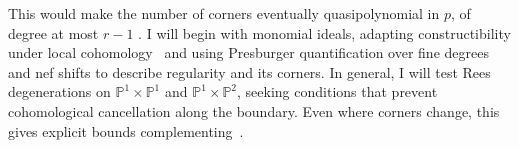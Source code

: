 \documentclass[11pt,reqno]{amsart}
\newtheorem{conjecture}[lemma]{Conjecture}
\theoremstyle{remark}
\newcommand{\reg}{\operatorname{reg}}
\newcommand{\Pic}{\operatorname{Pic}}
\newcommand{\Nef}{\operatorname{Nef}}
\newcommand{\dd}{\mathbf{d}}
\newcommand{\PP}{\mathbb{P}}
\newcommand{\RR}{\mathbb{R}}
\begin{document}
This would make the number of corners eventually quasipolynomial in $p$, of degree at most $r-1$ \cite{woods15}. I will begin with monomial ideals, adapting constructibility under local cohomology~\cite[Thm.~8.1]{DMMOW25} and using Presburger quantification over fine degrees and nef shifts to describe regularity and its corners. In general, I will test Rees degenerations on $\PP^1\times\PP^1$ and $\PP^1\times\PP^2$, seeking conditions that prevent cohomological cancellation along the boundary. Even where corners change, this gives explicit bounds complementing~\cite{bruceHellerSayrafiSeceleanu25}.

%
%
\end{document}
